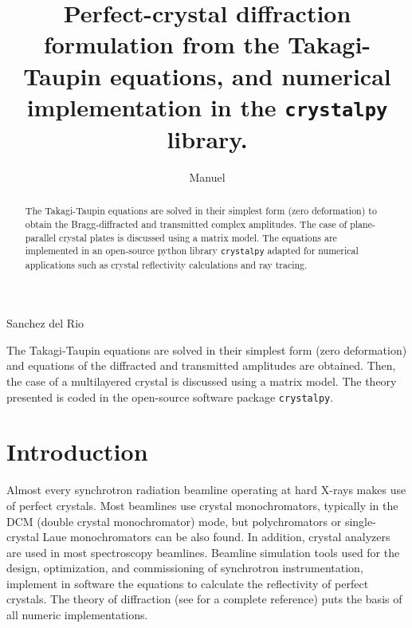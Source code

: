 \documentclass[preprint]{iucr}              %
\newcommand{\inblue}[1]{{\color{blue}#1}}
\begin{document}

\title{Perfect-crystal diffraction \inblue{formulation} from the Takagi-Taupin equations, and numerical implementation in the \texttt{crystalpy} library.}


\author[a]{Manuel}{Sanchez del Rio}



\maketitle   %

\begin{synopsis}
The Takagi-Taupin equations are solved in their simplest form (zero deformation) and equations of the diffracted and transmitted amplitudes are obtained. Then, the case of a multilayered crystal is discussed using a matrix model. The theory presented is coded in the open-source software package {\tt crystalpy}.
\end{synopsis}

\begin{abstract}

The Takagi-Taupin equations are solved in their simplest form (zero deformation) to obtain the Bragg-diffracted and transmitted complex amplitudes. The case of plane-parallel crystal plates is discussed using a matrix model. The equations are implemented in an open-source python library \texttt{crystalpy} adapted for numerical applications such as crystal reflectivity calculations and ray tracing.

\end{abstract}


%
\section{Introduction}
\label{sec:Intro}

Almost every synchrotron radiation beamline operating at hard X-rays makes use of perfect crystals.  
Most beamlines use crystal monochromators, typically in the DCM (double crystal monochromator) mode, but polychromators or single-crystal Laue monochromators can be also found. In addition, crystal analyzers are used in most spectroscopy beamlines. 
Beamline simulation tools used for the design, optimization, and commissioning of synchrotron instrumentation, implement in software the equations to calculate the reflectivity of perfect crystals. The theory of diffraction (see \cite{authierbook} for a complete reference) puts the basis of all numeric implementations. 
\end{document}
